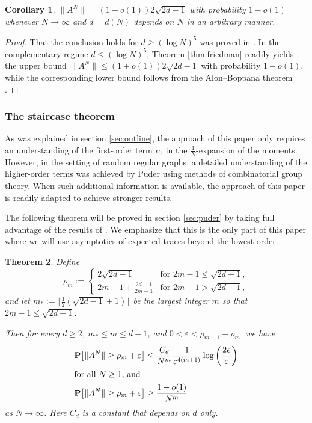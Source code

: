 \documentclass[10pt,reqno]{amsart}
\newtheorem{thm}{Theorem}[section]
\newtheorem{cor}[thm]{Corollary}
\theoremstyle{definition}
\theoremstyle{remark}
\numberwithin{equation}{section}
\numberwithin{figure}{section}
\numberwithin{table}{section}
\begin{document}
\begin{cor}
\label{cor:vu}
$\|A^N\|=(1+o(1))2\sqrt{2d-1}$ with probability $1-o(1)$ whenever
$N\to\infty$ and $d=d(N)$ depends on $N$ in an arbitrary manner.
\end{cor}

\begin{proof}
That the conclusion holds for $d\ge (\log N)^5$ was proved in
\cite[\S 3.2.2]{BV23}. In the complementary regime $d\le (\log N)^5$,
Theorem \ref{thm:friedman} readily yields the upper bound
$\|A^N\|\le(1+o(1))2\sqrt{2d-1}$ with probability $1-o(1)$, 
while the corresponding lower bound
follows from the Alon--Boppana theorem \cite{Nil91}.
\end{proof}


\subsubsection{The staircase theorem}

As was explained in section \ref{sec:outline}, the approach of this paper 
only requires an understanding of the first-order term $\nu_1$ in the 
$\frac{1}{N}$-expansion of the moments. However, in the setting of random 
regular graphs, a detailed understanding of the higher-order terms was 
achieved by Puder \cite{Pud15} using methods of combinatorial group 
theory. When such additional information is available, the approach of 
this paper is readily adapted to achieve stronger results.

The following theorem will be proved in section \ref{sec:puder} by taking 
full advantage of the results of \cite{Pud15}. We emphasize that this is 
the only part of this paper where we will use asymptotics of expected 
traces beyond the lowest order.

\begin{thm}
\label{thm:puder}
Define 
$$
	\rho_m := \begin{cases}
	2\sqrt{2d-1} & \text{for } 2m-1 \le \sqrt{2d-1},\\
	2m-1 + \tfrac{2d-1}{2m-1}
	& \text{for }2m-1>\sqrt{2d-1},
	\end{cases}
$$
and let
$m_* := \lfloor \frac{1}{2}(\sqrt{2d-1} + 1) \rfloor$
be the largest integer $m$ so that $2m-1\le\sqrt{2d-1}$.

Then for every $d\ge 2$, $m_*\le m\le d-1$, and
$0<\varepsilon<\rho_{m+1}-\rho_m$, we have
\begin{align*}
&	
	\mathbf{P}\big[\|A^N\| \ge
	\rho_m+\varepsilon\big]
	\le
	\frac{C_d}{N^m}
	\frac{1}{\varepsilon^{4(m+1)}}
	\log
	\bigg(\frac{2e}{\varepsilon}\bigg)
\\
\intertext{for all $N\ge 1$, and}
&
	\mathbf{P}\big[\|A^N\| \ge
        \rho_m+\varepsilon\big] \ge
	\frac{1-o(1)}{N^m}
\end{align*}
as $N\to\infty$. Here $C_d$ is a constant that depends on $d$ only.
\end{thm}
\end{document}
